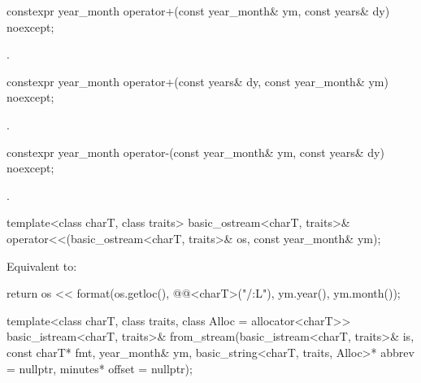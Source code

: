 %
\begin{itemdecl}
constexpr year_month operator+(const year_month& ym, const years& dy) noexcept;
\end{itemdecl}

\begin{itemdescr}
\pnum
\returns
{}.
\end{itemdescr}

%
\begin{itemdecl}
constexpr year_month operator+(const years& dy, const year_month& ym) noexcept;
\end{itemdecl}

\begin{itemdescr}
\pnum
\returns
{}.
\end{itemdescr}

%
\begin{itemdecl}
constexpr year_month operator-(const year_month& ym, const years& dy) noexcept;
\end{itemdecl}

\begin{itemdescr}
\pnum
\returns
{}.
\end{itemdescr}

%
\begin{itemdecl}
template<class charT, class traits>
  basic_ostream<charT, traits>&
    operator<<(basic_ostream<charT, traits>& os, const year_month& ym);
\end{itemdecl}

\begin{itemdescr}
\pnum
\effects
Equivalent to:
\begin{codeblock}
return os << format(os.getloc(), @@<charT>("{}/{:L}"),
                    ym.year(), ym.month());
\end{codeblock}
\end{itemdescr}

%
\begin{itemdecl}
template<class charT, class traits, class Alloc = allocator<charT>>
  basic_istream<charT, traits>&
    from_stream(basic_istream<charT, traits>& is, const charT* fmt,
                year_month& ym, basic_string<charT, traits, Alloc>* abbrev = nullptr,
                minutes* offset = nullptr);
\end{itemdecl}


